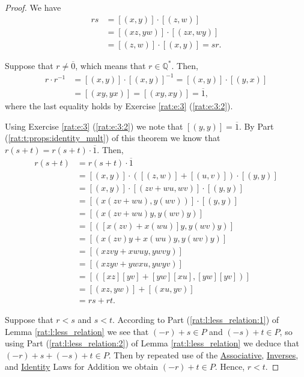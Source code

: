 \begin{proof}
	We have
	\begin{align*}
		r s & = [(x, y)] \cdot [(z, w)]         \\
		    & = [(x z, y w)] \cdot [(z x, w y)] \\
		    & = [(z, w)] \cdot [(x, y)] = s r.
	\end{align*}

	Suppose that $r \not= \overline{0}$, which means that $r \in \mathbb{Q}^{*}$. Then,
	\begin{align*}
		r \cdot r^{-1} & = [(x, y)] \cdot [(x, y)]^{-1} = [(x, y)] \cdot [(y, x)] \\
		               & = [(x y, y x)] = [(x y, x y)] = \overline{1},
	\end{align*}
	where the last equality holds by Exercise \ref{rat:e:3} (\ref{rat:e:3:2}).

	Using Exercise \ref{rat:e:3} (\ref{rat:e:3:2}) we note that $[(y, y)] = \overline{1}$. By Part (\ref{rat:t:props:identity_mult}) of this theorem we know that $r(s + t) = r(s + t) \cdot \overline{1}$. Then,
	\begin{align*}
		r(s + t) & = r(s + t) \cdot \overline{1}                         \\
		         & = [(x, y)] \cdot ([(z, w)] + [(u, v)]) \cdot [(y, y)] \\
		         & = [(x, y)] \cdot [(z v + w u, w v)] \cdot [(y, y)]    \\
		         & = [(x(z v + w u), y(w v))] \cdot [(y, y)]             \\
		         & = [(x(z v + w u)y, y(w v)y)]                          \\
		         & = [([x(z v) + x(w u)]y, y (w v) y)]                   \\
		         & = [(x(z v)y + x(w u)y, y (w v) y)]                    \\
		         & = [(x z v y + x w u y, y w v y)]                      \\
		         & = [(x z y v + y w x u, y w y v)]                      \\
		         & = [([x z] [y v] + [y w] [x u], [y w] [y v])]          \\
		         & = [(x z, y w)] + [(x u, y v)]                         \\
		         & = rs + rt.
	\end{align*}

	Suppose that $r < s$ and $s < t$. According to Part (\ref{rat:l:less_relation:1}) of Lemma \ref{rat:l:less_relation} we see that $(-r) + s \in P$ and $(-s) + t \in P$, so using Part (\ref{rat:l:less_relation:2}) of Lemma \ref{rat:l:less_relation} we deduce that $(-r) + s + (-s) + t \in P$. Then by repeated use of the \hyperref[rat:t:props:associative_add]{Associative}, \hyperref[rat:t:props:inverses_add]{Inverses}, and \hyperref[rat:t:props:identity_add]{Identity} Laws for Addition we obtain $(-r) + t \in P$. Hence, $r < t$.


\end{proof}
